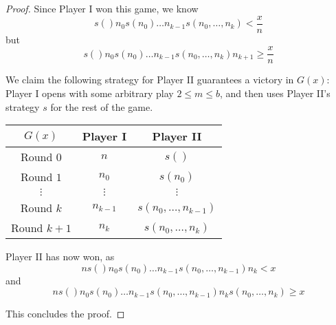 \documentclass[11pt]{article}
\theoremstyle{plain}
\theoremstyle{definition}
\theoremstyle{remark}
\newcommand{\<}{\langle}
\renewcommand{\>}{\rangle}
\begin{document}
\begin{proof}
Since Player I won this game, we know 
  \[
    s()n_0s(n_0)\dots n_{k-1}s(n_0,\dots,n_k) < \frac{x}{n}
  \]
but 
  \[
    s()n_0s(n_0)\dots n_{k-1}s(n_0,\dots,n_k)n_{k+1} \geq \frac{x}{n}
  \]

We claim the following strategy for Player II guarantees a victory in $G(x)$: Player I opens with some arbitrary play $2\leq m \leq b$, and then uses Player II's strategy $s$ for the rest of the game.

\begin{center}\begin{tabular}{c|c|c}
$G(x)$ & Player I & Player II \\\hline
Round $0$ & $n$ & $s()$ \\\hline
Round $1$ & $n_0$ & $s(n_0)$ \\\hline
$\vdots$ & $\vdots$ & $\vdots$ \\\hline
Round $k$ & $n_{k-1}$ & $s(n_0,\dots,n_{k-1})$ \\\hline
Round $k+1$ & $n_k$ & $s(n_0,\dots,n_k)$
\end{tabular}\end{center}

Player II has now won, as
  \[
    ns()n_0s(n_0)\dots n_{k-1}s(n_0,\dots,n_{k-1})n_k < x
  \]
and 
  \[
    ns()n_0s(n_0)\dots n_{k-1}s(n_0,\dots,n_{k-1})n_ks(n_0,\dots,n_k) \geq x
  \]

This concludes the proof.
\end{proof}
\end{document}
